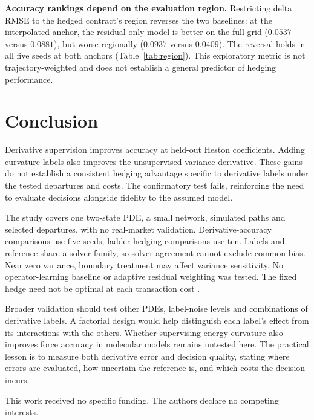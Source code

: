 \documentclass{article}
\begin{document}
\textbf{Accuracy rankings depend on the evaluation region.} Restricting delta
RMSE to the hedged contract's region reverses the two baselines: at the interpolated
anchor, the residual-only model is better on the full grid ($0.0537$ versus
$0.0881$), but worse regionally ($0.0937$ versus $0.0409$). The reversal holds in
all five seeds at both anchors (Table~\ref{tab:region}). This exploratory metric
is not trajectory-weighted and does not establish a general predictor of hedging
performance.

\section{Conclusion}
\label{sec:limits}

Derivative supervision improves accuracy at held-out Heston coefficients.
Adding curvature labels also improves the unsupervised variance derivative.
These gains do not establish a consistent hedging advantage specific to derivative
labels under the tested departures and costs. The confirmatory test fails,
reinforcing the need to evaluate decisions alongside fidelity to the assumed model.

The study covers one two-state PDE, a small network, simulated paths and selected
departures, with no real-market validation. Derivative-accuracy comparisons use five seeds;
ladder hedging comparisons use ten. Labels and reference share a solver family,
so solver agreement cannot exclude common bias. Near zero variance, boundary
treatment may affect variance sensitivity. No operator-learning baseline or
adaptive residual weighting was tested. The fixed hedge need not be optimal at
each transaction cost \citep{whalley1997asymptotic}.

Broader validation should test other PDEs, label-noise levels and combinations of
derivative labels. A factorial design would help distinguish each label's effect
from its interactions with the others. Whether supervising energy curvature also
improves force accuracy in molecular models remains untested here. The practical
lesson is to measure both derivative error and decision quality, stating where
errors are evaluated, how uncertain the reference is, and which costs the decision incurs.

\clearpage
\begin{ack}
This work received no specific funding. The authors declare no competing interests.
\end{ack}
\end{document}
